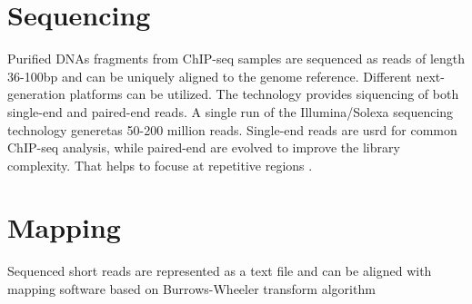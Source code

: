 \section{Sequencing}
Purified DNAs fragments from ChIP-seq samples are sequenced as reads of length 36-100bp and can be uniquely aligned to the genome reference.
Different next-generation platforms can be utilized.
The technology provides siquencing of both single-end and paired-end reads.
A single run of the Illumina/Solexa sequencing technology generetas 50-200 million reads\cite{park2009chip}.
Single-end reads are usrd for common ChIP-seq analysis, while paired-end are evolved to improve the library complexity.
That helps to focuse at repetitive regions \cite{chen2012systematic}.

\section{Mapping}
Sequenced short reads are represented as a text file and can be aligned with mapping software based on Burrows-Wheeler transform algorithm \cite{li2009fast} \cite{siren2014indexing}
